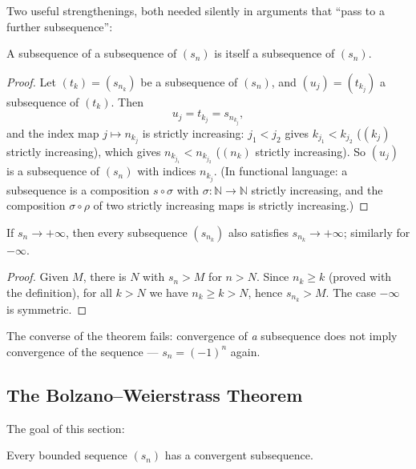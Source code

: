 \documentclass[11pt]{report}
\begin{document}
Two useful strengthenings, both needed silently in arguments that ``pass to a further subsequence'':

\begin{propbox}
A subsequence of a subsequence of $(s_n)$ is itself a subsequence of $(s_n)$.
\end{propbox}

\begin{proof}
Let $(t_k) = (s_{n_k})$ be a subsequence of $(s_n)$, and $(u_j) = (t_{k_j})$ a subsequence of $(t_k)$. Then
\[
u_j = t_{k_j} = s_{n_{k_j}},
\]
and the index map $j \mapsto n_{k_j}$ is strictly increasing: $j_1 < j_2$ gives $k_{j_1} < k_{j_2}$ ($(k_j)$ strictly increasing), which gives $n_{k_{j_1}} < n_{k_{j_2}}$ ($(n_k)$ strictly increasing). So $(u_j)$ is a subsequence of $(s_n)$ with indices $n_{k_j}$. (In functional language: a subsequence is a composition $s \circ \sigma$ with $\sigma: \mathbb{N} \to \mathbb{N}$ strictly increasing, and the composition $\sigma \circ \rho$ of two strictly increasing maps is strictly increasing.)
\end{proof}

\begin{propbox}
If $s_n \to +\infty$, then every subsequence $(s_{n_k})$ also satisfies $s_{n_k} \to +\infty$; similarly for $-\infty$.
\end{propbox}

\begin{proof}
Given $M$, there is $N$ with $s_n > M$ for $n > N$. Since $n_k \geq k$ (proved with the definition), for all $k > N$ we have $n_k \geq k > N$, hence $s_{n_k} > M$. The case $-\infty$ is symmetric.
\end{proof}

\begin{rembox}
The converse of the theorem fails: convergence of \emph{a} subsequence does not imply convergence of the sequence --- $s_n = (-1)^n$ again.
\end{rembox}

\subsection{The Bolzano--Weierstrass Theorem}

The goal of this section:

\begin{thmbox}
Every bounded sequence $(s_n)$ has a convergent subsequence.
\end{thmbox}
\end{document}
